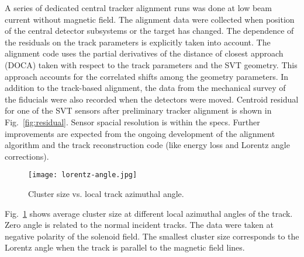 A series of dedicated central tracker alignment runs was done at low beam current without magnetic field. The alignment data were collected when position of the central detector subsystems or the target has changed. The dependence of the residuals on the track parameters is explicitly taken into account. The alignment code uses the partial derivatives of the distance of closest approach (DOCA) taken with respect to the track parameters and the SVT geometry. This approach accounts for the correlated shifts among the geometry parameters. In addition to the track-based alignment, the data from the mechanical survey of the fiducials were also recorded when the detectors were moved. Centroid residual for one of the SVT sensors after preliminary tracker alignment is shown in Fig.~\ref{fig:residual}. Sensor spacial resolution is within the specs. Further improvements are expected from the ongoing development of the alignment algorithm and the track reconstruction code (like energy loss and Lorentz angle corrections).

\begin{figure}[hbt] 
\centering 
\texttt{[image: lorentz-angle.jpg]}
\caption{Cluster size vs. local track azimuthal angle.}
\label{fig:lorentz-angle}
\end{figure}

Fig.~\ref{fig:lorentz-angle} shows average cluster size at different local azimuthal angles of the track. Zero angle is related to the normal incident tracks. The data were taken at negative polarity of the solenoid field. The smallest cluster size corresponds to the Lorentz angle when the track is parallel to the magnetic field lines.

